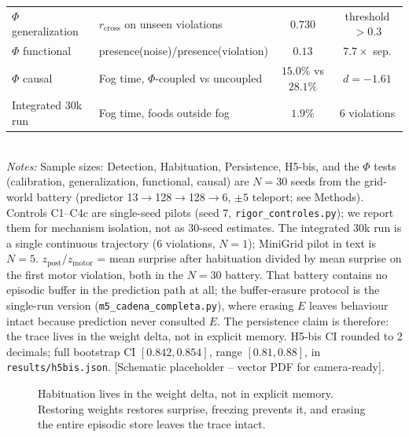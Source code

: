 \documentclass[11pt,a4paper]{article}
\begin{document}
\begin{table}[h]
\begin{tabular}{@{}llcc@{}}
$\Phi$ generalization & $r_{\mathrm{cross}}$ on unseen violations & $0.730$ & threshold $>0.3$ \\
$\Phi$ functional & presence(noise)/presence(violation) & $0.13$ & $7.7\times$ sep. \\
$\Phi$ causal & Fog time, $\Phi$-coupled vs uncoupled & $15.0\%$ vs $28.1\%$ & $d=-1.61$ \\
Integrated 30k run & Fog time, foods outside fog & $1.9\%$ & 6 violations \\
\bottomrule
\end{tabular}
\\[0.6ex]
{\small \textit{Notes:} Sample sizes: Detection, Habituation, Persistence, H5-bis, and the $\Phi$ tests (calibration, generalization, functional, causal) are $N=30$ seeds from the grid-world battery (predictor 13$\rightarrow$128$\rightarrow$128$\rightarrow$6, $\pm5$ teleport; see Methods). Controls C1--C4c are single-seed pilots (seed 7, \texttt{rigor\_controles.py}); we report them for mechanism isolation, not as 30-seed estimates. The integrated 30k run is a single continuous trajectory (6 violations, $N=1$); MiniGrid pilot in text is $N=5$. $z_{\mathrm{post}}/z_{\mathrm{motor}}$ = mean surprise after habituation divided by mean surprise on the first motor violation, both in the $N=30$ battery. That battery contains no episodic buffer in the prediction path at all; the buffer-erasure protocol is the single-run version (\texttt{m5\_cadena\_completa.py}), where erasing $E$ leaves behaviour intact because prediction never consulted $E$. The persistence claim is therefore: the trace lives in the weight delta, not in explicit memory. H5-bis CI rounded to 2 decimals; full bootstrap CI $[0.842,0.854]$, range $[0.81,0.88]$, in \texttt{results/h5bis.json}. [Schematic placeholder -- vector PDF for camera-ready].}
\end{table}

\begin{figure}[h]
\centering
{}
\caption{Habituation lives in the weight delta, not in explicit memory. Restoring weights restores surprise, freezing prevents it, and erasing the entire episodic store leaves the trace intact.}
\label{fig:hab}
\end{figure}
\end{document}
